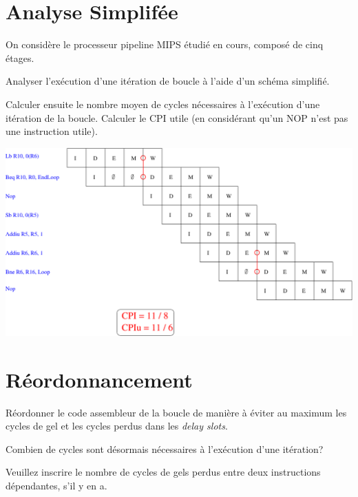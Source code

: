 %
%

\section{Analyse Simplif\'ee}

On consid\`ere le processeur pipeline MIPS \'etudi\'e en cours, compos\'e
de cinq \'etages.

Analyser l'ex\'ecution d'une it\'eration de boucle \`a l'aide d'un
sch\'ema simplifi\'e.

Calculer ensuite le nombre moyen de cycles n\'ecessaires \`a
l'ex\'ecution d'une it\'eration de la boucle. Calculer le CPI utile
(en consid\'erant qu'un NOP n'est pas une instruction utile).

\begin{correction}

  \begin{center}
    \includegraphics[scale=0.7]{figures/correction-analyse-simplifiee.pdf}
  \end{center}

\end{correction}

%
%

\section{R\'eordonnancement}

R\'eordonner le code assembleur de la boucle de mani\`ere \`a \'eviter
au maximum les cycles de gel et les cycles perdus dans les
\textit{delay slots}.

Combien de cycles sont d\'esormais n\'ecessaires \`a l'ex\'ecution d'une
it\'eration?

Veuillez inscrire le nombre de cycles de gels perdus entre deux instructions
d\'ependantes, s'il y en a.

